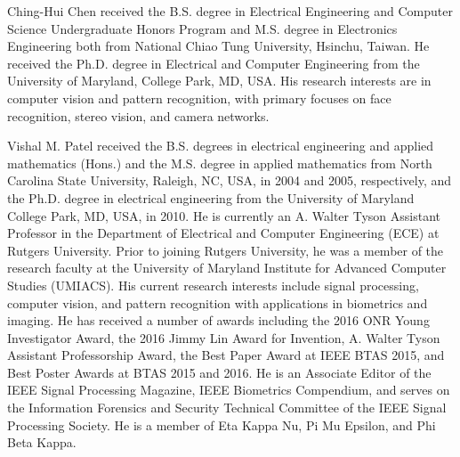 \documentclass[10pt,journal,compsoc]{IEEEtran}
\begin{document}
\ifCLASSOPTIONcaptionsoff
  \newpage
\fi












\vspace{-20pt}
\begin{IEEEbiography}{Ching-Hui Chen}
received the B.S. degree in Electrical
Engineering and Computer Science Undergraduate
Honors Program and M.S. degree in Electronics
Engineering both from National Chiao Tung University,
Hsinchu, Taiwan. He received the Ph.D. degree in Electrical and Computer
Engineering from the University of Maryland,
College Park, MD, USA. His research interests are
in computer vision and pattern recognition, with
primary focuses on face recognition, stereo vision, and camera networks.
\end{IEEEbiography}
\vspace{-20pt}
\begin{IEEEbiography}{Vishal M. Patel}
received the B.S. degrees in electrical engineering and applied mathematics (Hons.) and the M.S. degree in applied mathematics from North Carolina State University, Raleigh, NC, USA, in 2004 and 2005, respectively, and the Ph.D. degree in electrical engineering from the University of Maryland College Park, MD, USA, in 2010. He is currently an A. Walter Tyson Assistant Professor in the Department of Electrical and Computer Engineering (ECE) at Rutgers University.  Prior to joining Rutgers University, he was a member of the research faculty at the University of Maryland Institute for Advanced Computer Studies (UMIACS). His current research interests include signal processing, computer vision, and pattern recognition with applications in biometrics and imaging. He has received a number of awards including the 2016 ONR Young Investigator Award, the 2016 Jimmy Lin Award for Invention,  A. Walter Tyson Assistant Professorship Award, the Best Paper Award at IEEE BTAS 2015, and Best Poster Awards at BTAS 2015 and 2016.  He is an Associate Editor of the IEEE Signal Processing Magazine,  IEEE Biometrics Compendium, and serves on the Information Forensics and Security Technical Committee of the IEEE Signal Processing Society.   He is a member of Eta Kappa Nu, Pi Mu Epsilon, and Phi Beta Kappa.\end{IEEEbiography}
\end{document}
